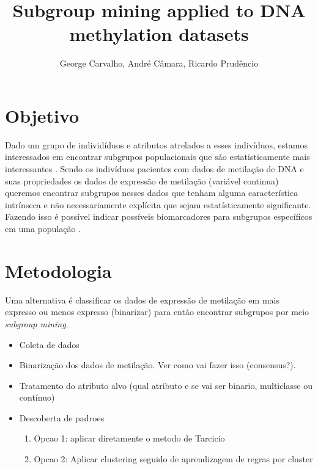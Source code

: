 \documentclass{article}
\title{Subgroup mining applied to DNA methylation datasets}
\author{George Carvalho, André Câmara, Ricardo Prudêncio}
\affil{Universidade Federal de Pernambuco}
\begin{document}
\maketitle        

\begin{abstract}

\color{black}
\end{abstract}

\section{Objetivo}

Dado um grupo de individíduos e atributos atrelados a esses indivíduos, estamos interessados em encontrar subgrupos populacionais que são estatisticamente mais interessantes \cite{wen2017cell,park2019finding}. Sendo os indivíduos pacientes com dados de metilação de DNA e suas propriedades os dados de expressão de metilação (variável continua) queremos encontrar subgrupos nesses dados que tenham alguma característica intrínseca e não necessariamente explícita que sejam estatísticamente significante. Fazendo isso é possível indicar possíveis biomarcadores para subgrupos específicos em uma população \cite{wen2017cell}.

\section{Metodologia}

Uma alternativa é classificar os dados de expressão de metilação em mais expresso ou menos expresso (binarizar) \cite{wang2019biomethyl, cedoz2018methylmix} para então encontrar subgrupos por meio \textit{subgroup mining}.

\begin{itemize}
    \item Coleta de dados
    \item Binarização dos dados de metilação. Ver como vai fazer isso (consensus?).
    
    \item Tratamento do atributo alvo (qual atributo e se vai ser binario, multiclasse ou contínuo)
    
    \item Descoberta de padroes
    \begin{enumerate}
        \item Opcao 1: aplicar diretamente o metodo de Tarcicio
        \item Opcao 2: Aplicar clustering seguido de aprendizagem de regras por cluster
    \end{enumerate}
\end{itemize}
\end{document}
